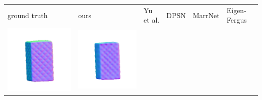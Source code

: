 \begin{tabularx}{\linewidth}{@{}Y@{}Y@{}Y@{}Y@{}Y@{}Y@{}}
ground truth & ours & Yu et al. & DPSN & MarrNet & Eigen-Fergus \\
\includegraphics[width=\linewidth]{semisynthetic/20160617_18_gt.png} &
\includegraphics[width=\linewidth]{semisynthetic/20160617_18_ours_out.png} &

\end{tabularx}
